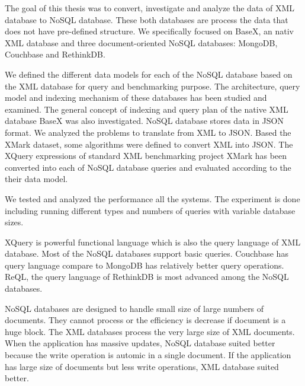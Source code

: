 The goal of this thesis was to convert, investigate and analyze the data of XML database to NoSQL database. These both databases are process the data that does not have pre-defined structure. We specifically focused on BaseX, an nativ XML database and three document-oriented NoSQL databases: MongoDB, Couchbase and RethinkDB. 

We defined the different data models for each of the NoSQL database based on the XML database for query and benchmarking purpose. The architecture, query model and indexing mechanism of these databases has been studied and examined. The general concept of indexing and query plan of the native XML database BaseX was also investigated. NoSQL database stores data in JSON format. We analyzed the problems  to translate  from XML to JSON. Based the XMark dataset, some algorithms were defined to convert XML into JSON.
The XQuery expressions of standard XML benchmarking project XMark has been converted into each of NoSQL database queries and evaluated according to the their data model. \par
We tested and analyzed the performance all the systems. The experiment is done including running different types and numbers of queries with variable database sizes. 

XQuery is powerful functional language which is also the query language of XML database. Most of the NoSQL databases support basic queries. Couchbase has query language compare to MongoDB has relatively better query operations. ReQL, the query language of RethinkDB is most advanced among the NoSQL databases. 

\par
NoSQL databases are designed to handle small size of large numbers of documents. They cannot process or the efficiency is decrease if document is a huge block. The XML databases process the very large size of XML documents. When the application has massive updates, NoSQL database suited better because the write operation is automic in a single document. If the application has large size of documents but less write operations,  XML database suited better. 






